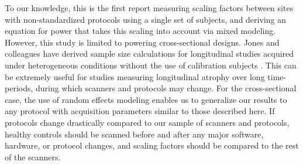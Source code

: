 To our knowledge, this is the first report measuring scaling factors between sites with non-standardized protocols using a single set of subjects, and deriving an equation for power that takes this scaling into account via mixed modeling. However, this study is limited to powering cross-sectional designs. Jones and colleagues have derived sample size calculations for longitudinal studies acquired under heterogeneous conditions without the use of calibration subjects \cite{jones2013quantification}. This can be extremely useful for studies measuring longitudinal atrophy over long time-periods, during which scanners and protocols may change. For the cross-sectional case, the use of random effects modeling enables us to generalize our results to any protocol with acquisition parameters similar to those described here. If protocols change drastically compared to our sample of scanners and protocols, healthy controls should be scanned before and after any major software, hardware, or protocol changes, and scaling factors should be compared to the rest of the scanners.
